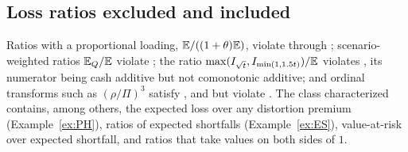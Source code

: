 \subsection{Loss ratios excluded and included}

Ratios with a proportional loading, $\mathbb E/((1+\theta)\mathbb E)$, violate \axR{} through \axN; scenario-weighted ratios
$\mathbb E_Q/\mathbb E$ violate \axLI; the ratio $\max(I_{\sqrt t},I_{\min(1,1.5t)})/\mathbb E$ violates \axR, its numerator being cash
additive but not comonotonic additive; and ordinal transforms such as $(\rho/\Pi)^3$ satisfy \axPe, \axP{} and \axN{}
but violate \axR.
The class characterized contains, among others, the expected loss over any distortion premium
(Example~\ref{ex:PH}), ratios of expected shortfalls (Example~\ref{ex:ES}), value-at-risk over expected shortfall,
and ratios that take values on both sides of $1$.
